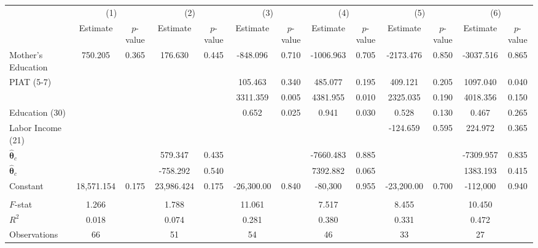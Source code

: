 \begin{tabular}{lcccccccccccc} \toprule
 & \multicolumn{2}{c}{(1)}  &  \multicolumn{2}{c}{(2)}  &  \multicolumn{2}{c}{(3)}  &  \multicolumn{2}{c}{(4)}  & \multicolumn{2}{c}{(5)} & \multicolumn{2}{c}{(6)} \\  
 & Estimate & $p$-value & Estimate & $p$-value & Estimate & $p$-value & Estimate & $p$-value & Estimate & $p$-value & Estimate & $p$-value \\ \midrule
Mother's Education &   750.205 &     0.365 &   176.630 &     0.445 &  -848.096 &     0.710 & -1006.963 &     0.705 & -2173.476 &     0.850 & -3037.516 &     0.865 \\  
PIAT (5-7) &        &        &        &        &   105.463 &     0.340 &   485.077 &     0.195 &   409.121 &     0.205 &  1097.040 &     0.040 \\  
 &        &        &        &        &  3311.359 &     0.005 &  4381.955 &     0.010 &  2325.035 &     0.190 &  4018.356 &     0.150 \\  
Education (30) &        &        &        &        &     0.652 &     0.025 &     0.941 &     0.030 &     0.528 &     0.130 &     0.467 &     0.265 \\  
Labor Income (21) &        &        &        &        &        &        &        &        &  -124.659 &     0.595 &   224.972 &     0.365 \\  
$\hat{\bm{\theta}}_c$ &        &        &   579.347 &     0.435 &        &        & -7660.483 &     0.885 &        &        & -7309.957 &     0.835 \\  
$\hat{\bm{\theta}}_c$&        &        &  -758.292 &     0.540 &        &        &  7392.882 &     0.065 &        &        &  1383.193 &     0.415 \\  
Constant & 18,571.154 &     0.175 & 23,986.424 &     0.175 & -26,300.00 &     0.840 & -80,300 &     0.955 & -23,200.00 &     0.700 & -112,000 &     0.940 \\  \\ \midrule
$F$-stat &     1.266 &      &     1.788 &      &    11.061 &     &     7.517 &     &     8.455 &     &    10.450 &      \\  
$R^2$ &     0.018 &      &     0.074 &      &     0.281 &      &     0.380 &      &     0.331 &     &     0.472 &     \\  
Observations &    66 &      &    51 &    &    54 &   &    46 &      &    33 &      &    27 &     \\  
\bottomrule \end{tabular}
